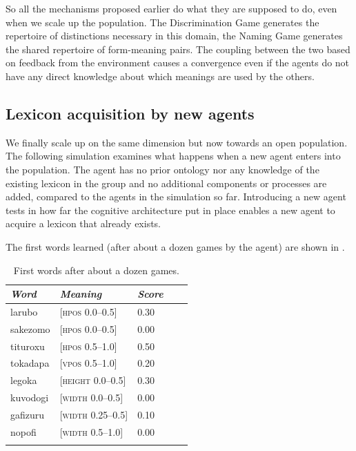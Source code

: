 So all the mechanisms proposed earlier 
do what they are supposed to do, even when we 
scale up the population. The Discrimination 
Game generates the repertoire of distinctions 
necessary in this domain, the Naming Game generates
the shared repertoire of form-meaning pairs. The 
coupling between the two based on feedback from 
the environment causes a convergence even if the
agents do not have any direct knowledge about 
which meanings are used by the others. 

\subsection{Lexicon acquisition by new agents}

We finally scale up on the same dimension but 
now towards an open population. The following 
simulation examines what happens when a new agent 
enters into the population. The agent has no 
prior ontology nor any knowledge of the existing
lexicon in the group and no additional components
or processes are added, compared to the agents
in the simulation so far. Introducing a new 
agent tests in how far the cognitive architecture
put in place enables a new agent to acquire a 
lexicon that already exists. 

The first words learned (after about a dozen 
games by the agent) are shown in . 


\begin{table}
\begin{center}
\begin{tabular}{ l  l  l  l  l }
\lsptoprule
{\itshape Word} & {\itshape Meaning} & {\itshape Score} \\ \midrule
larubo  & [\textsc{hpos} 0.0–0.5] & 0.30 \\ 
sakezomo &  [\textsc{hpos} 0.0–0.5] & 0.00 \\ 
tituroxu &  [\textsc{hpos} 0.5–1.0] & 0.50 \\ 
tokadapa & [\textsc{vpos} 0.5–1.0] & 0.20 \\ 
legoka   & [\textsc{height} 0.0–0.5] & 0.30 \\ 
kuvodogi  & [\textsc{width} 0.0–0.5] & 0.00 \\ 
gafizuru &  [\textsc{width} 0.25–0.5] & 0.10  \\ 
nopofi  & [\textsc{width} 0.5–1.0] & 0.00 \\ 
\lspbottomrule
\end{tabular}
\caption{\label{tab:first}First words after about a dozen games.}
\end{center}
\end{table}

